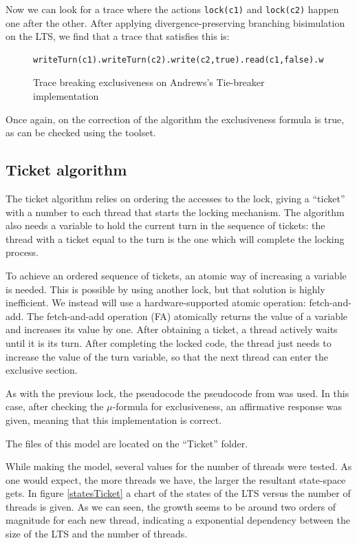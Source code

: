 \documentclass[11pt]{article}
\theoremstyle{definition}
\theoremstyle{plain}
\theoremstyle{definition}
\begin{document}
\begin{appendices}
Now we can look for a trace where the actions \texttt{lock(c1)} and \texttt{lock(c2)} happen one after the other. After applying divergence-preserving branching bisimulation on the LTS, we find that a trace that satisfies this is:

\begin{figure}[h]
\begin{lstlisting}
writeTurn(c1).writeTurn(c2).write(c2,true).read(c1,false).write(c1,true).readTurn(c2).read(c2,true).readTurn(c2).lock(c1).lock(c2)
\end{lstlisting}
\caption{Trace breaking exclusiveness on Andrews's Tie-breaker implementation}
\end{figure}

Once again, on the correction of the algorithm the exclusiveness formula is true, as can be checked using the toolset.

\subsection{Ticket algorithm}
The ticket algorithm relies on ordering the accesses to the lock, giving a ``ticket'' with a number to each thread that starts the locking mechanism. The algorithm also needs a variable to hold the current turn in the sequence of tickets: the thread with a ticket equal to the turn is the one which will complete the locking process. 

To achieve an ordered sequence of tickets, an atomic way of increasing a variable is needed. This is possible by using another lock, but that solution is highly inefficient. We instead will use a hardware-supported atomic operation: fetch-and-add. The fetch-and-add operation (FA) atomically returns the value of a variable and increases its value by one. After obtaining a ticket, a thread actively waits until it is its turn. After completing the locked code, the thread just needs to increase the value of the turn variable, so that the next thread can enter the exclusive section.


As with the previous lock, the pseudocode the pseudocode from \cite{andrews2000foundations} was used. In this case, after checking the $ \mu $-formula for exclusiveness, an affirmative response was given, meaning that this implementation is correct.

The files of this model are located on the ``Ticket'' folder.

While making the model, several values for the number of threads were tested. As one would expect, the more threads we have, the larger the resultant state-space gets. In figure \ref{statesTicket} a chart of the states of the LTS versus the number of threads is given. As we can seen, the growth seems to be around two orders of magnitude for each new thread, indicating a exponential dependency between the size of the LTS and the number of threads.


\end{appendices}
\end{document}
